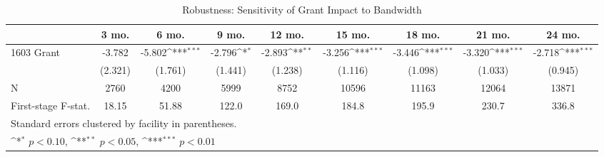 \begin{table}[htbp]\centering
\def\sym#1{\ifmmode^{#1}\else\(^{#1}\)\fi}
\caption{Robustness: Sensitivity of Grant Impact to Bandwidth\label{RDD:logCFbandwidth}}
\begin{tabular}{l*{8}{c}}
\hline\hline
                    &\multicolumn{1}{c}{3 mo.}&\multicolumn{1}{c}{6 mo.}&\multicolumn{1}{c}{9 mo.}&\multicolumn{1}{c}{12 mo.}&\multicolumn{1}{c}{15 mo.}&\multicolumn{1}{c}{18 mo.}&\multicolumn{1}{c}{21 mo.}&\multicolumn{1}{c}{24 mo.}\\
\hline
1603 Grant          &      -3.782         &      -5.802\sym{***}&      -2.796\sym{*}  &      -2.893\sym{**} &      -3.256\sym{***}&      -3.446\sym{***}&      -3.320\sym{***}&      -2.718\sym{***}\\
                    &     (2.321)         &     (1.761)         &     (1.441)         &     (1.238)         &     (1.116)         &     (1.098)         &     (1.033)         &     (0.945)         \\
\hline
N                   &        2760         &        4200         &        5999         &        8752         &       10596         &       11163         &       12064         &       13871         \\
First-stage F-stat. &       18.15         &       51.88         &       122.0         &       169.0         &       184.8         &       195.9         &       230.7         &       336.8         \\
\hline\hline
\multicolumn{9}{l}{\footnotesize Standard errors clustered by facility in parentheses.}\\
\multicolumn{9}{l}{\footnotesize \sym{*} \(p<0.10\), \sym{**} \(p<0.05\), \sym{***} \(p<0.01\)}\\
\end{tabular}
\end{table}
